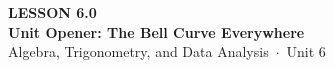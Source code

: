 \documentclass[aspectratio=169, 11pt]{beamer}
\begin{document}
{
\begin{frame}[plain]
  \vspace{2.8cm}\hspace{0.55cm}%
  \begin{minipage}{0.9\textwidth}
    {\color{goldacc}\bfseries\small LESSON 6.0}\\[0.5cm]
    {\color{white}\bfseries\LARGE Unit Opener: The Bell Curve Everywhere}\\[1.2cm]
    {\color{mistmid}\small Algebra, Trigonometry, and Data Analysis~$\cdot$~Unit 6}
  \end{minipage}
\end{frame}
}

\begin{frame}[t, plain]
\end{frame}
\end{document}
